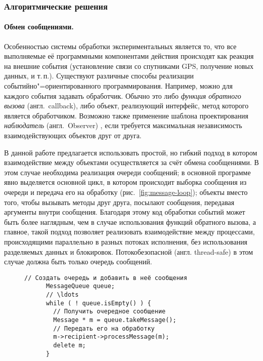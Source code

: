 \documentclass[a4paper, 14pt, titlepage]{extarticle}
\newcommand{\eng}[1]{\foreignlanguage{english}{#1}}
\newcommand{\term}[1]{\emph{#1}}
\newenvironment{myfigure}[2]%
    {\pushQED{\caption{#1} \label{#2}} %
     \begin{figure}[!htb]\centering } %
    {  \popQED %
     \end{figure}}
\let\oldparagraph\paragraph
\renewcommand{\paragraph}[1]{\oldparagraph{\indent #1}}
\begin{document}
  \subsubsection{Алгоритмические решения}
  \paragraph{Обмен сообщениями.}
  Особенностью системы обработки экспериментальных является то, что все выполняемые её программными
  компонентами действия происходят как реакция на внешние события (установление связи со
  спутниками GPS, получение новых данных, и т.\,п.). Существуют различные способы реализации
  событийно"=ориентированного программирования. Например, можно для каждого события задавать
  обработчик. Обычно это либо \term{функция обратного вызова} (англ.~\eng{callback}), либо объект,
  реализующий интерфейс, метод которого является обработчиком. Возможно также применение шаблона
  проектирования \term{наблюдатель} (англ.~\eng{Observer}) \cite{gamma-patterns}, если требуется
  максимальная независимость взаимодействующих объектов друг от друга.

  В данной работе предлагается использовать простой, но гибкий подход в котором взаимодействие между
  объектами осуществляется за счёт обмена сообщениями. В этом случае необходима реализация очереди
  сообщений; в основной программе явно выделяется основной цикл, в котором происходит выборка
  сообщения из очереди и передача его на обработку (рис.~\ref{fig:message-loop}); объекты вместо
  того, чтобы вызывать методы друг друга, посылают сообщения, передавая аргументы внутри сообщения.
  Благодаря этому код обработки событий может быть более наглядным, чем в случае использования
  функций обратного вызова, а главное, такой подход позволяет реализовать взаимодействие между
  процессами, происходящими параллельно в разных потоках исполнения, без использования разделяемых
  данных и блокировок. Потокобезопасной (англ. \eng{thread-safe}) в этом случае должна быть только
  очередь сообщений.

  \begin{myfigure}{Примерный вид основного цикла}{fig:message-loop}
    \begin{lstlisting}[gobble=6, texcl, xleftmargin=2cm, xrightmargin=2cm]
      // Создать очередь и добавить в неё сообщения
      MessageQueue queue;
      // \ldots
      while ( ! queue.isEmpty() ) {
        // Получить очередное сообщение
        Message * m = queue.takeMessage();
        // Передать его на обработку
        m->recipient->processMessage(m);
        delete m;
      }
    \end{lstlisting}
  \end{myfigure}
\end{document}
